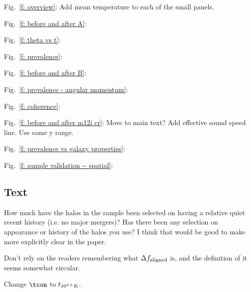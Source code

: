 Fig.~\ref{f: overview}:
Add mean temperature to each of the small panels.

Fig.~\ref{f: before and after A}:

Fig.~\ref{f: theta vs t}:

Fig.~\ref{f: prevalence}:

Fig.~\ref{f: before and after B}:

Fig.~\ref{f: prevalence - angular momentum}:

Fig.~\ref{f: coherence}:

Fig.~\ref{f: before and after m12i cr}:
Move to main text?
Add effective sound speed line.
Use same y range.

Fig.~\ref{f: prevalence vs galaxy properties}:

Fig.~\ref{f: sample validation -- spatial}:

\subsection{Text}

How much have the halos in the sample been selected on having a relative quiet recent history (i.e. no major mergers)? Has there been any selection on appearance or history of the halos you use? I think that would be good to make more explicitly clear in the paper. 

Don't rely on the readers remembering what $\Delta f_{\rm aligned}$ is, and the definition of it seems somewhat circular.

Change $\tcon$ to $t_{10^{4.5}\,{\rm K}}$.

